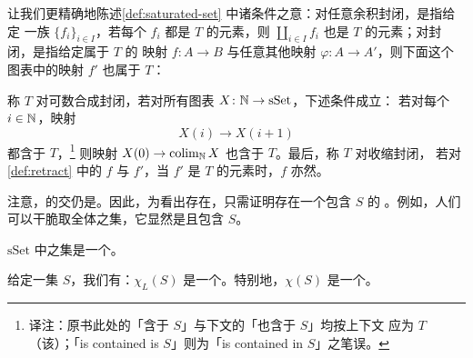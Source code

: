 \begin{remark}\label{rem:saturated-conditions}
让我们更精确地陈述\cref{def:saturated-set} 中诸条件之意：对任意余积封闭，是指给定
一族 $\{f_i\}_{i \in I}$，若每个 $f_i$ 都是 $T$ 的元素，则
$\amalg_{i \in I} f_i$ 也是 $T$ 的元素；对\trPushout{}封闭，是指给定属于 $T$ 的
映射 $f\colon A \to B$ 与任意其他映射 $\varphi\colon A \to A'$，则下面这个%
\trPushout{}图表中的映射 $f'$ 也属于 $T$：
\begin{center}
\end{center}
称 $T$ 对可数合成封闭，若对所有图表 $X\colon \mathbb{N} \to \mathrm{sSet}$，下述条件成立：
若对每个 $i \in \mathbb{N}$，映射
\[
X(i) \to X(i + 1)
\]
都含于 $T$，\footnote{译注：原书此处的「含于 $S$」与下文的「也含于 $S$」均按上下文
应为 $T$（该\trSaturatedSet{}）；「is contained is $S$」则为「is contained in $S$」之笔误。}
则映射 $X(0) \to \operatorname{colim}_{\mathbb{N}} X$ 也含于 $T$。最后，称 $T$ 对收缩封闭，
若对\cref{def:retract} 中的 $f$ 与 $f'$，当 $f'$ 是 $T$ 的元素时，$f$ 亦然。
\end{remark}

\begin{remark}\label{rem:saturated-closure-exists}
注意，\trSaturatedSet{}的交仍是\trSaturatedSet{}。因此，为看出\trSaturation{}存在，只需证明存在一个包含 $S$ 的%
\trSaturatedSet{}。例如，人们可以干脆取全体\trMorphism{}之集，它显然是\trSaturated{}且包含 $S$。
\end{remark}

\begin{example*}
$\mathrm{sSet}$ 中\trMonomorphism{}之集是一个\trSaturatedSet{}。
\end{example*}

\begin{lemma}\label{lem:chi-l-saturated}
给定一集\trMorphism{} $S$，我们有：$\chi_L(S)$ 是一个\trSaturatedSet{}。特别地，$\chi(S)$
是一个\trSaturatedSet{}。
\end{lemma}

